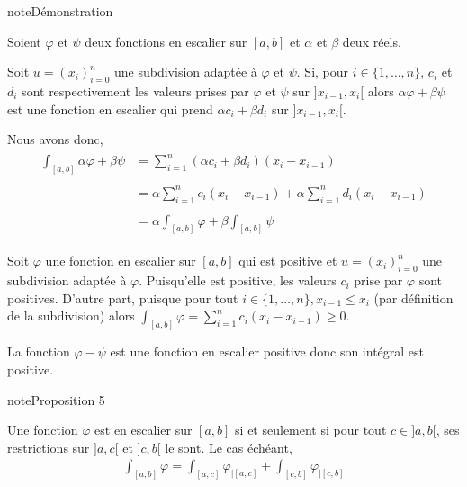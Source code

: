 \documentclass[letterpaper,10pt,french]{sphinxmanual}
\begin{document}
\begin{sphinxadmonition}{note}{Démonstration}

\sphinxhyphen{}

\sphinxAtStartPar
Soient \(\varphi\) et \(\psi\) deux fonctions en escalier sur \([a, b]\) et \(\alpha\) et \(\beta\) deux réels.

\sphinxAtStartPar
Soit \(u=(x_i)_{i=0}^n\) une subdivision adaptée à  \(\varphi\) et \(\psi\). Si, pour \(i \in \{1, \ldots, n\}\), \(c_i\) et \(d_i\) sont respectivement les valeurs prises par \(\varphi\) et \(\psi\) sur \(]x_{i-1}, x_i[\) alors \(\alpha\varphi + \beta\psi\) est une fonction en escalier qui prend \(\alpha c_i + \beta d_i\) sur \(]x_{i-1}, x_i[\).

\sphinxAtStartPar
Nous avons donc,
\begin{equation*}
\begin{split}
\begin{aligned}
\int_{[a, b]}\alpha\varphi + \beta\psi & = \sum_{i=1}^{n}(\alpha c_i + \beta d_i)(x_i-x_{i-1})   \\ \\
 & =  \alpha\sum_{i=1}^{n} c_i(x_i-x_{i-1}) +  \alpha\sum_{i=1}^{n} d_i(x_i-x_{i-1}) \\ \\
 & = \alpha\int_{[a, b]}\varphi + \beta\int_{[a, b]}\psi
\end{aligned}
\end{split}
\end{equation*}
\sphinxhyphen{}

\sphinxAtStartPar
Soit \(\varphi\) une fonction en escalier sur \([a, b]\) qui est positive et  \(u=(x_i)_{i=0}^n\) une subdivision adaptée à \(\varphi\). Puisqu’elle est positive, les valeurs \(c_i\) prise par \(\varphi\) sont positives. D’autre part, puisque pour tout \(i \in \{1, \ldots, n\}, x_{i-1} \leq x_i\) (par définition de la subdivision) alors \(\int_{[a, b]}\varphi = \sum_{i=1}^{n} c_i(x_i-x_{i-1}) \geq 0\).

\sphinxhyphen{}

\sphinxAtStartPar
La fonction \(\varphi - \psi\) est une fonction en escalier positive donc son intégral est positive.
\end{sphinxadmonition}

\begin{sphinxadmonition}{note}{Proposition 5}

\sphinxAtStartPar
Une fonction \(\varphi\) est en escalier sur \([a, b]\) si et seulement si pour tout \(c \in ]a, b[\), ses restrictions sur \(]a, c[\) et \(]c, b[\) le sont. Le cas échéant,
\begin{equation*}
\begin{split}
\int_{[a, b]}\varphi = \int_{[a, c]}\varphi_{|[a, c]} + \int_{[c, b]}\varphi_{|[c, b]}
\end{split}
\end{equation*}\end{sphinxadmonition}
\end{document}
